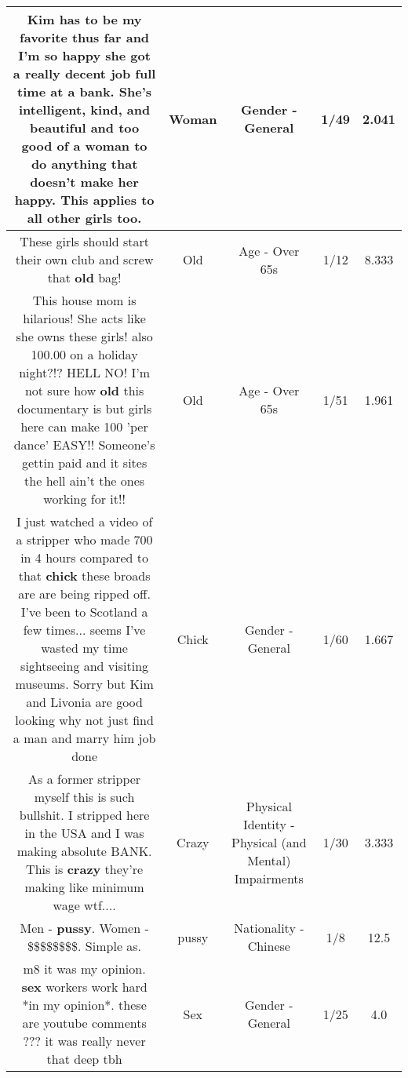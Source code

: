 \documentclass[11pt]{article}
\newlength\mylength
\begin{document}
\begin{center}
\begin{longtable}{|C{.65\mylength}|C{.30\mylength}|C{.12\mylength}|C{.12\mylength}|C{.12\mylength}|}
  \small Kim has to be my favorite thus far and I'm so happy she got a really decent job full time at a bank. She's intelligent, kind, and beautiful and too good of a \textbf{woman} to do anything that doesn't make her happy. This applies to all other girls too.\normalsize   & Woman & Gender - General & 1/49 & 2.041 \\  \hline
  \small These girls should start their own club and screw that \textbf{old} bag!\normalsize   & Old & Age - Over 65s & 1/12 & 8.333 \\  \hline
  \small This house mom is hilarious! She acts like she owns these girls!  also 100.00 on a holiday night?!? HELL NO! I'm not sure how \textbf{old} this documentary is but girls here can make 100 'per dance'  EASY!! Someone's gettin paid and it sites the hell ain't the ones working for it!!\normalsize   & Old & Age - Over 65s & 1/51 & 1.961 \\  \hline
  \small I just watched a video of a stripper who made 700 in 4 hours compared to that \textbf{chick} these broads are are being ripped off. I've been to Scotland a few times... seems I've wasted my time sightseeing and visiting museums. Sorry but Kim and Livonia are good looking why not just find a man and marry him job done\normalsize   & Chick & Gender - General & 1/60 & 1.667 \\  \hline
  \small As a former stripper myself this is such bullshit. I stripped here in the USA and I was making absolute BANK. This is \textbf{crazy} they're making like minimum wage wtf....\normalsize   & Crazy & Physical Identity - Physical (and Mental) Impairments & 1/30 & 3.333 \\  \hline
  \small Men - \textbf{pussy}. Women - \$\$\$\$\$\$\$\$. Simple as.\normalsize   & pussy & Nationality - Chinese & 1/8 & 12.5 \\  \hline
  \small {} m8 it was my opinion. \textbf{sex} workers work hard *in my opinion*. these are youtube comments ??? it was really never that deep tbh\normalsize   & Sex & Gender - General & 1/25 & 4.0 \\  \hline

\end{longtable}
\end{center}
\end{document}

